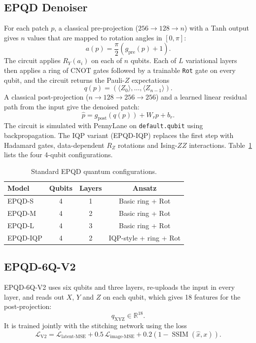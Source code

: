 \documentclass[runningheads]{llncs}
\begin{document}
\subsection{EPQD Denoiser}
For each patch $p$, a classical pre-projection ($256\rightarrow128\rightarrow n$) with a Tanh output gives $n$ values that are mapped to rotation angles in $[0,\pi]$:
\begin{equation}
    a(p)=\frac{\pi}{2}\left(g_{\mathrm{pre}}(p)+1\right).
\end{equation}
The circuit applies $R_Y(a_i)$ on each of $n$ qubits. Each of $L$ variational layers then applies a ring of CNOT gates followed by a trainable \texttt{Rot} gate on every qubit, and the circuit returns the Pauli-$Z$ expectations
\begin{equation}
    q(p)=\left(\langle Z_0\rangle,\ldots,\langle Z_{n-1}\rangle\right).
\end{equation}
A classical post-projection ($n\rightarrow128\rightarrow256\rightarrow256$) and a learned linear residual path from the input give the denoised patch:
\begin{equation}
    \hat p=g_{\mathrm{post}}(q(p))+W_rp+b_r.
\end{equation}
The circuit is simulated with PennyLane on \texttt{default.qubit} using backpropagation. The IQP variant (EPQD-IQP) replaces the first step with Hadamard gates, data-dependent $R_Z$ rotations and Ising-$ZZ$ interactions. Table~\ref{tab:configs} lists the four 4-qubit configurations.

\begin{table}[t]
\centering
\caption{Standard EPQD quantum configurations.}
\label{tab:configs}
\begin{tabular}{lccc}
\toprule
\textbf{Model} & \textbf{Qubits} & \textbf{Layers} & \textbf{Ansatz}\\
\midrule
EPQD-S & 4 & 1 & Basic ring + Rot\\
EPQD-M & 4 & 2 & Basic ring + Rot\\
EPQD-L & 4 & 3 & Basic ring + Rot\\
EPQD-IQP & 4 & 2 & IQP-style + ring + Rot\\
\bottomrule
\end{tabular}
\end{table}

\subsection{EPQD-6Q-V2}
EPQD-6Q-V2 uses six qubits and three layers, re-uploads the input in every layer, and reads out $X$, $Y$ and $Z$ on each qubit, which gives 18 features for the post-projection:
\begin{equation}
    q_{\mathrm{XYZ}}\in\mathbb{R}^{18}.
\end{equation}
It is trained jointly with the stitching network using the loss
\begin{equation}
    \mathcal{L}_{\mathrm{V2}}=
    \mathcal{L}_{\mathrm{latent\text{-}MSE}}
    +0.5\,\mathcal{L}_{\mathrm{image\text{-}MSE}}
    +0.2\left(1-\operatorname{SSIM}(\hat x,x)\right).
\end{equation}
\end{document}
